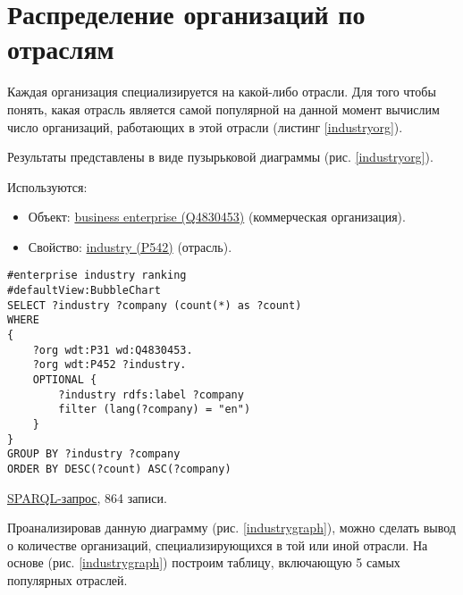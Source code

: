 \section*{Распределение организаций по отраслям}

Каждая организация специализируется на какой-либо отрасли. Для того чтобы понять, какая отрасль является самой популярной на данной момент вычислим число организаций, работающих в этой отрасли (листинг \ref{industryorg}).

Результаты представлены в виде пузырьковой диаграммы (рис. \ref{industryorg}).

Используются:
\begin{itemize}
    \item Объект: \href{https://www.wikidata.org/wiki/Q4830453}{business enterprise (Q4830453)} (коммерческая организация).
    \item Свойство: \href{https://www.wikidata.org/wiki/Property:P452}{industry (P542)} (отрасль).
\end{itemize}

\begin{lstlisting}[language=SPARQL,label=industryorg,caption=Пузырьковая диаграмма распределения организаций по отраслям]
#enterprise industry ranking
#defaultView:BubbleChart
SELECT ?industry ?company (count(*) as ?count)
WHERE 
{
    ?org wdt:P31 wd:Q4830453.
    ?org wdt:P452 ?industry.
    OPTIONAL {
		?industry rdfs:label ?company
		filter (lang(?company) = "en")
	}
}
GROUP BY ?industry ?company
ORDER BY DESC(?count) ASC(?company)
\end{lstlisting}

\href{https://query.wikidata.org/#%23enterprise%20industry%20ranking%0A%23defaultView%3ABubbleChart%0ASELECT%20%3Findustry%20%3Fcompany%20%28count%28%2a%29%20as%20%3Fcount%29%0AWHERE%20%0A%7B%0A%20%20%20%20%3Forg%20wdt%3AP31%20wd%3AQ4830453.%0A%20%20%20%20%3Forg%20wdt%3AP452%20%3Findustry%20.%0A%20%20%20%20OPTIONAL%20%7B%0A%09%09%3Findustry%20rdfs%3Alabel%20%3Fcompany%0A%09%09filter%20%28lang%28%3Fcompany%29%20%3D%20%22en%22%29%0A%09%7D%0A%7D%0AGROUP%20BY%20%3Findustry%20%3Fcompany%0AORDER%20BY%20DESC%28%3Fcount%29%20ASC%28%3Fcompany%29%0A}{SPARQL-запрос}, 864 записи.

Проанализировав данную диаграмму (рис. \ref{industrygraph}), можно сделать вывод о количестве организаций, специализирующихся в той или иной отрасли. На основе (рис. \ref{industrygraph}) построим таблицу, включающую 5 самых популярных отраслей.
 
